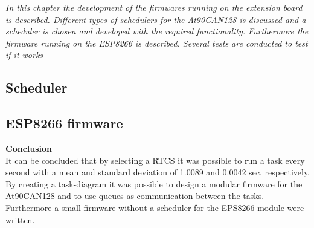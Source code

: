 \textit{In this chapter the development of the firmwares running on the extension board is described. Different types of schedulers for the At90CAN128 is discussed and a scheduler is chosen and developed with the required functionality. Furthermore the firmware running on the ESP8266 is described. Several tests are conducted to test if it works}
\subsection{Scheduler}

%

\subsection{ESP8266 firmware} \label{sec:exp8266_firmware}


\textbf{Conclusion} \\
It can be concluded that by selecting a \ac{RTCS} it was possible to run a task every second with a mean and standard deviation of 1.0089 and 0.0042 sec. respectively. By creating a task-diagram it was possible to design a modular firmware for the At90CAN128 and to use queues as communication between the tasks. Furthermore a small firmware without a scheduler for the EPS8266 module were written.



